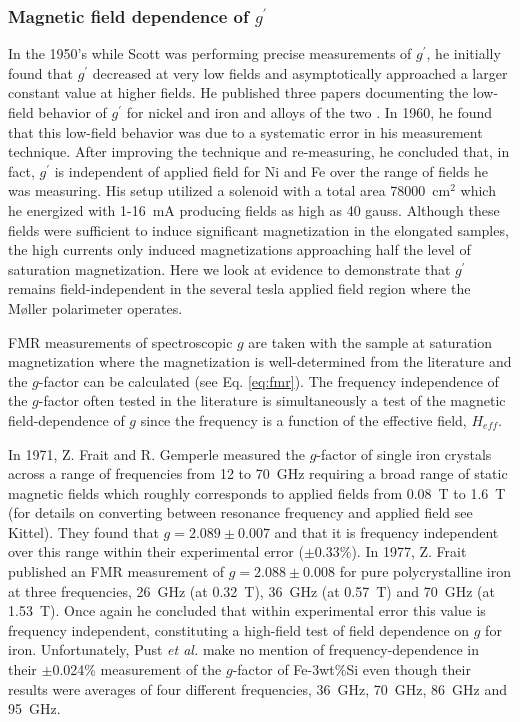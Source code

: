 \documentclass[preprint,12pt]{elsarticle}
\begin{document}
{\subsubsection{Magnetic field dependence of $g^{\prime}$}
In the 1950's while Scott was performing precise measurements of $g^{\prime}$, he initially found that $g^{\prime}$ decreased at very low fields and asymptotically approached a larger constant value at higher fields. He published three papers documenting the low-field behavior of $g^{\prime}$ for nickel and iron and alloys of the two \cite{ScottAug1955, ScottSep1955, ScottAug1956}. In 1960, he found that this low-field behavior was due to a systematic error in his measurement technique\cite{Scott1960}. After improving the technique and re-measuring, he concluded that, in fact, $g^\prime$ is independent of applied field for Ni and Fe over the range of fields he was measuring. His setup utilized a solenoid with a total area 78000~cm$^2$ which he energized with 1-16~mA producing fields as high as 40 gauss. Although these fields were sufficient to induce significant magnetization in the elongated samples, the high currents only induced magnetizations approaching half the level of saturation magnetization. Here we look at evidence to demonstrate that $g^\prime$ remains field-independent in the several tesla applied field region where the M\o ller polarimeter operates.

FMR measurements of spectroscopic $g$ are taken with the sample at saturation magnetization where the magnetization is well-determined from the literature and the $g$-factor can be calculated (see Eq. \ref{eq:fmr}). The frequency independence of the $g$-factor often tested in the literature is simultaneously a test of the magnetic field-dependence of $g$ since the frequency is a function of the effective field, $H_{eff}$.

In 1971, Z. Frait and R. Gemperle measured the $g$-factor of single iron crystals across a range of frequencies from 12 to 70~GHz requiring a broad range of static magnetic fields\cite{Frait1971} which roughly corresponds to applied fields from  0.08~T to 1.6~T (for details on converting between resonance frequency and applied field see Kittel\cite{Kittel1948}). They found that $g=2.089\pm0.007$ and that it  is frequency independent over this range within their experimental error ($\pm$0.33\%). In 1977, Z. Frait published an FMR measurement of $g=2.088\pm0.008$ for pure polycrystalline iron at three frequencies, 26~GHz (at 0.32~T), 36~GHz (at 0.57~T) and 70~GHz (at 1.53~T)\cite{Frait1977}. Once again he concluded that within experimental error this value is frequency independent, constituting a high-field test of field dependence on $g$ for iron. Unfortunately, Pust {\it et al.} make no mention of frequency-dependence in their $\pm$0.024\% measurement of the $g$-factor of Fe-3wt\%Si even though their results were averages of four different frequencies, 36~GHz, 70~GHz, 86~GHz and 95~GHz\cite{Pust1981}. 

}
\end{document}
